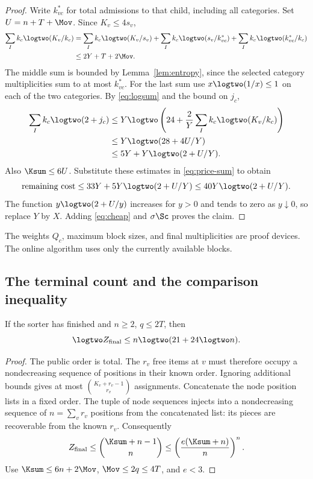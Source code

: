 \begin{proof}
Write $k^*_{vc}$ for total admissions to that child, including all categories.
Set $U=n+T+\Mov$. Since $K_v\leq4s_v$,
\begin{align*}
\sum_I k_c\logtwo(K_v/k_c)
&=\sum_I k_c\logtwo(K_v/s_v)
 +\sum_I k_c\logtwo(s_v/k^*_{vc})
 +\sum_I k_c\logtwo(k^*_{vc}/k_c)\\
&\leq2Y+T+2\Mov.
\end{align*}
The middle sum is bounded by Lemma~\ref{lem:entropy}, since the selected
category multiplicities sum to at most $k^*_{vc}$.
For the last sum use $x\logtwo(1/x)\leq1$ on each of the two categories.
By \eqref{eq:logsum} and the bound on $j_c$,
\[
\begin{split}
\sum_I k_c\logtwo(2+j_c)
&\leq Y\logtwo\left(24+\frac2Y\sum_I k_c\logtwo(K_v/k_c)\right)\\
&\leq Y\logtwo(28+4U/Y)\\
&\leq5Y+Y\logtwo(2+U/Y).
\end{split}
\]
Also $\Ksum\leq6U$. Substitute these estimates in
\eqref{eq:price-sum} to obtain
\[
 \text{remaining cost}\leq33Y+5Y\logtwo(2+U/Y)
                      \leq40Y\logtwo(2+U/Y).
\]
The function $y\logtwo(2+U/y)$ increases for $y>0$ and tends to zero
as $y\downarrow0$, so replace $Y$ by $X$.
Adding \eqref{eq:cheap} and $\sigma\Sc$ proves the claim.
\end{proof}

The weights $Q_c$, maximum block sizes, and final multiplicities are proof
devices. The online algorithm uses only the currently available blocks.

\subsection{The terminal count and the comparison inequality}

\begin{lemma}
\label{lem:terminal}
If the sorter has finished and $n\geq2$, $q\leq2T$, then
\[
                      \logtwo Z_{\mathrm{final}}
                      \leq n\logtwo(21+24\logtwo n).
\]
\end{lemma}
\begin{proof}
The public order is total. The $r_v$ free items at $v$ must therefore
occupy a nondecreasing sequence of positions in their known order.
Ignoring additional bounds gives at most $\binom{K_v+r_v-1}{r_v}$
assignments. Concatenate the node position lists in a fixed order.
The tuple of node sequences injects into a nondecreasing sequence of
$n=\sum_v r_v$ positions from the concatenated list: its pieces are
recoverable from the known $r_v$.
Consequently
\[
 Z_{\mathrm{final}}\leq\binom{\Ksum+n-1}{n}
              \leq\left(\frac{e(\Ksum+n)}n\right)^n .
\]
Use $\Ksum\leq6n+2\Mov$, $\Mov\leq2q\leq4T$, and $e<3$.
\end{proof}

